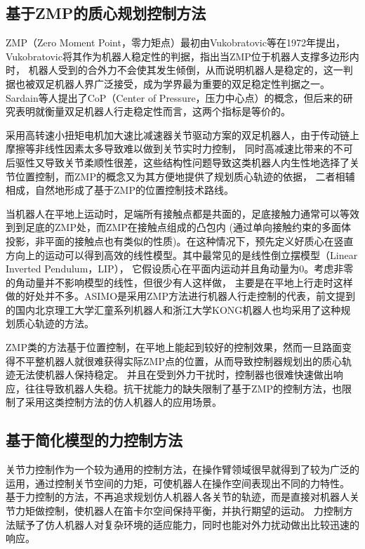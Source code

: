 \subsection{基于ZMP的质心规划控制方法}
ZMP（Zero Moment Point，零力矩点）最初由Vukobratovic等在1972年提出\cite{vukobratovic2004zero}，Vukobratovic将其作为机器人稳定性的判据，指出当ZMP位于机器人支撑多边形内时，
机器人受到的合外力不会使其发生倾倒，从而说明机器人是稳定的，这一判据也被双足机器人界广泛接受，成为学界最为重要的双足稳定性判据之一。
Sardain等人提出了CoP（Center of Pressure，压力中心点）的概念，但后来的研究表明就衡量双足机器人行走稳定性而言，这两个指标是等价的。

采用高转速小扭矩电机加大速比减速器关节驱动方案的双足机器人，由于传动链上摩擦等非线性因素太多导致难以做到关节实时力控制，
同时高减速比带来的不可后驱性又导致关节柔顺性很差，这些结构性问题导致这类机器人内生性地选择了关节位置控制，而ZMP的概念又为其方便地提供了规划质心轨迹的依据，
二者相辅相成，自然地形成了基于ZMP的位置控制技术路线。

当机器人在平地上运动时，足端所有接触点都是共面的，足底接触力通常可以等效到到足底的ZMP处，而ZMP在接触点组成的凸包内\cite{wieber2002stability}
(通过单向接触约束的多面体投影，非平面的接触点也有类似的性质\cite{caron2016zmp})。在这种情况下，预先定义好质心在竖直方向上的运动可以得到高效的线性模型。其中最常见的是线性倒立摆模型（Linear Inverted Pendulum，LIP），
它假设质心在平面内运动并且角动量为0\cite{kajita1991study}。考虑非零的角动量并不影响模型的线性，但很少有人这样做，
主要是在平地上行走时这样做的好处并不多\cite{koolen2012capturability}。ASIMO是采用ZMP方法进行机器人行走控制的代表，前文提到的国内北京理工大学汇童系列机器人和浙江大学KONG机器人也均采用了这种规划质心轨迹的方法。

ZMP类的方法基于位置控制，在平地上能起到较好的控制效果，然而一旦路面变得不平整机器人就很难获得实际ZMP点的位置，从而导致控制器规划出的质心轨迹无法使机器人保持稳定。
并且在受到外力干扰时，控制器也很难快速做出响应，往往导致机器人失稳。抗干扰能力的缺失限制了基于ZMP的控制方法，也限制了采用这类控制方法的仿人机器人的应用场景。

\subsection{基于简化模型的力控制方法}
关节力控制作为一个较为通用的控制方法，在操作臂领域很早就得到了较为广泛的运用，通过控制关节空间的力矩，可使机器人在操作空间表现出不同的力特性。
基于力控制的方法，不再追求规划仿人机器人各关节的轨迹，而是直接对机器人关节力矩做控制，使机器人在笛卡尔空间保持平衡，并执行期望的运动。
力控制方法赋予了仿人机器人对复杂环境的适应能力，同时也能对外力扰动做出比较迅速的响应。

